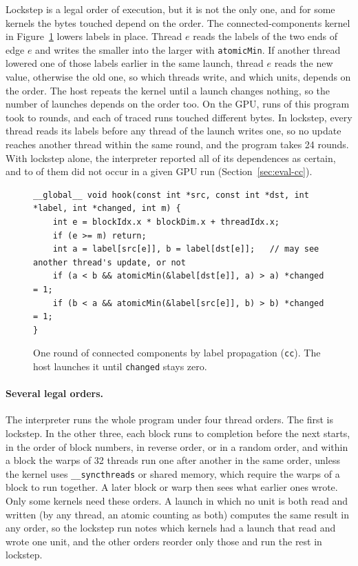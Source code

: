 \documentclass[11pt]{article}
\newcommand{\secref}[1]{Section~\ref{#1}}
\newcommand{\figref}[1]{Figure~\ref{#1}}
\newcommand{\code}[1]{\texttt{#1}}
\begin{document}
Lockstep is a legal order of execution, but it is not the only one, and for some kernels the bytes touched depend
on the order. The connected-components kernel in \figref{fig:cc} lowers labels in place. Thread $e$ reads the
labels of the two ends of edge $e$ and writes the smaller into the larger with \code{atomicMin}. If another thread
lowered one of those labels earlier in the same launch, thread $e$ reads the new value, otherwise the old one, so
which threads write, and which units, depends on the order. The host repeats the kernel until a launch changes
nothing, so the number of launches depends on the order too. On the GPU, \numCcGpuRuns{} runs of this program took
\numCcGpuRoundsLo{} to \numCcGpuRoundsHi{} rounds, and each of \numCcReps{} traced runs touched different bytes. In
lockstep, every thread reads its labels before any thread of the launch writes one, so no update reaches another
thread within the same round, and the program takes 24 rounds. With lockstep alone, the interpreter reported all of
its dependences as certain, and \numCcLockFalseLo{} to \numCcLockFalseHi{} of them did not occur in a given GPU run
(\secref{sec:eval-cc}).

\begin{figure}[tbp]
\begin{lstlisting}
__global__ void hook(const int *src, const int *dst, int *label, int *changed, int m) {
    int e = blockIdx.x * blockDim.x + threadIdx.x;
    if (e >= m) return;
    int a = label[src[e]], b = label[dst[e]];   // may see another thread's update, or not
    if (a < b && atomicMin(&label[dst[e]], a) > a) *changed = 1;
    if (b < a && atomicMin(&label[src[e]], b) > b) *changed = 1;
}
\end{lstlisting}
\caption{One round of connected components by label propagation (\code{cc}). The host launches it until
\code{changed} stays zero.}
\label{fig:cc}
\end{figure}

\paragraph{Several legal orders.} The interpreter runs the whole program under four thread orders. The first is
lockstep. In the other three, each block runs to completion before the next starts, in the order of block numbers,
in reverse order, or in a random order, and within a block the warps of 32 threads run one after another in the
same order, unless the kernel uses \code{\_\_syncthreads} or shared memory, which require the warps of a block to
run together. A later block or warp then sees what earlier ones wrote. Only some kernels need these orders. A launch
in which no unit is both read and written (by any thread, an atomic counting as both) computes the same result in
any order, so the lockstep run notes which kernels had a launch that read and wrote one unit, and the other orders
reorder only those and run the rest in lockstep.
\end{document}
